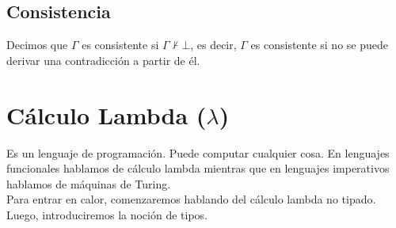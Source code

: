 \documentclass[10pt,a4paper]{article}
\begin{document}
\subsection*{Consistencia}
Decimos que $\Gamma$ es consistente si $\Gamma \nvdash \bot$, es decir, $\Gamma$ es consistente si no se puede derivar una contradicción a partir de él.
\section*{Cálculo Lambda ($\lambda$)}
Es un lenguaje de programación. Puede computar cualquier cosa. En lenguajes funcionales hablamos de cálculo lambda mientras que en lenguajes imperativos hablamos de máquinas de Turing. \\
Para entrar en calor, comenzaremos hablando del cálculo lambda no tipado. Luego, introduciremos la noción de tipos.
\end{document}

